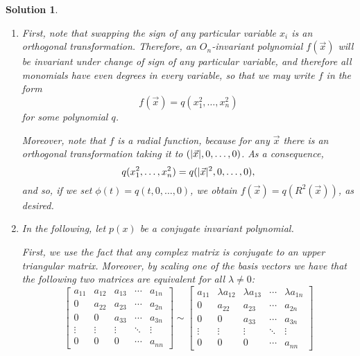 \documentclass{article}
\theoremstyle{nonumberplain}
\newtheorem{sol}{Solution}
\DeclarePairedDelimiter{\norm}{\lvert}{\rvert}
\begin{document}
\begin{sol} \leavevmode
\begin{enumerate}
\item First, note that swapping the sign of any particular variable $x_i$ is an orthogonal transformation. Therefore, an $O_n$-invariant polynomial $f(\vec x)$ will be invariant under change of sign of any particular variable, and therefore \emph{all monomials have even degrees in every variable}, so that we may write $f$ in the form
\begin{equation}
f(\vec x) = q(x_1^2, \dots, x_n^2)
\end{equation}
for some polynomial $q$.

Moreover, note that $f$ is a radial function, because for any $\vec x$ there is an orthogonal transformation taking it to $(\norm{\vec x},0,\dots,0)$. As a consequence,
\begin{equation}
q(x_1^2, \dots, x_n^2) = q(\norm{\vec x}^2, 0, \dots, 0),
\end{equation} 
and so, if we set $\phi(t) = q(t,0,\dots,0)$, we obtain $f(\vec x) = q(R^2(\vec x))$, as desired.

\item In the following, let $p(x)$ be a conjugate invariant polynomial.

First, we use the fact that any complex matrix is conjugate to an upper triangular matrix. Moreover, by scaling one of the basis vectors we have that the following two matrices are equivalent for all $\lambda \neq 0$:
\begin{equation}\label{eq:ut}
\begin{bmatrix}
a_{11} & a_{12} & a_{13} & \cdots & a_{1n} \\
0 & a_{22} & a_{23} & \cdots & a_{2n} \\
0 & 0 & a_{33} & \cdots & a_{3n} \\
\vdots & \vdots & \vdots & \ddots & \vdots \\
0 & 0 & 0 & \cdots & a_{nn}
\end{bmatrix}
\sim
\begin{bmatrix}
a_{11} & \lambda a_{12} & \lambda a_{13} & \cdots & \lambda a_{1n} \\
0 & a_{22} & a_{23} & \cdots & a_{2n} \\
0 & 0 & a_{33} & \cdots & a_{3n} \\
\vdots & \vdots & \vdots & \ddots & \vdots \\
0 & 0 & 0 & \cdots & a_{nn}
\end{bmatrix}
\end{equation}


\end{enumerate}
\end{sol}
\end{document}
